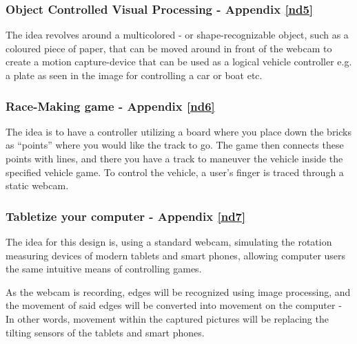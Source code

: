 \subsubsection{Object Controlled Visual Processing - Appendix \ref{nd5}}
The idea revolves around a multicolored - or shape-recognizable object, such as a coloured piece of paper, that can be moved around in front of the webcam to create a motion capture-device that can be used as a logical vehicle controller e.g. a plate as seen in the image for controlling a car or boat etc.

\subsubsection{Race-Making game - Appendix \ref{nd6}}
The idea is to have a controller utilizing a board where you place down the bricks as “points” where you would like the track to go. The game then connects these points with lines, and there you have a track to maneuver the vehicle inside the specified vehicle game. To control the vehicle, a user’s finger is traced through a static webcam.

\subsubsection{Tabletize your computer - Appendix \ref{nd7}}
The idea for this design is, using a standard webcam, simulating the rotation measuring devices of modern tablets and smart phones, allowing computer users the same intuitive means of controlling games.

As the webcam is recording, edges will be recognized using image processing, and the movement of said edges will be converted into movement on the computer - In other words, movement within the captured pictures will be replacing the tilting sensors of the tablets and smart phones.

